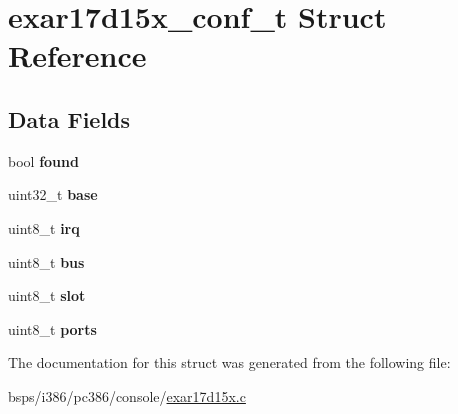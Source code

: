 \hypertarget{structexar17d15x__conf__t}{}\section{exar17d15x\+\_\+conf\+\_\+t Struct Reference}
\label{structexar17d15x__conf__t}
\subsection*{Data Fields}
\begin{DoxyCompactItemize}
\item 
\mbox{\label{structexar17d15x__conf__t_ae9879dd5779f061920d86006a5c2a9d1}} 
bool {\bfseries found}
\item 
\mbox{\label{structexar17d15x__conf__t_a612b1e437c491d11fbd9962446344b5d}} 
uint32\+\_\+t {\bfseries base}
\item 
\mbox{\label{structexar17d15x__conf__t_afd5055c8e1396e4d8ee79f7ac0b25a14}} 
uint8\+\_\+t {\bfseries irq}
\item 
\mbox{\label{structexar17d15x__conf__t_a360bb0499da19da20cb6f653cc237d60}} 
uint8\+\_\+t {\bfseries bus}
\item 
\mbox{\label{structexar17d15x__conf__t_ae9bcf89877efefdcd5668f4e2624811d}} 
uint8\+\_\+t {\bfseries slot}
\item 
\mbox{\label{structexar17d15x__conf__t_abefa024f6a9bae3daac2ff0bbdcb377b}} 
uint8\+\_\+t {\bfseries ports}
\end{DoxyCompactItemize}


The documentation for this struct was generated from the following file\+:\begin{DoxyCompactItemize}
\item 
bsps/i386/pc386/console/\mbox{\hyperlink{exar17d15x_8c}{exar17d15x.\+c}}\end{DoxyCompactItemize}
